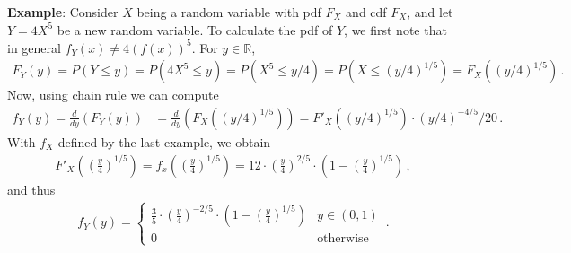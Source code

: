 \documentclass[11pt,oneside]{book}
\theoremstyle{newStyle}
\newcommand{\R}{\mathbb{R}}
\begin{document}
\textbf{Example}:
Consider $X$ being a random variable with pdf $F_X$ and cdf $F_X$, and let $Y = 4X^5$ be a new random variable. To calculate the pdf of $Y$, we first note that in general $f_Y(x) \neq 4(f(x))^5$. For $y \in \R$, 
\begin{align*}
F_Y(y) = P(Y\leq y) = P(4X^5\leq y) = P(X^5\leq y/4) = P(X\leq (y/4)^{1/5}) = F_X((y/4)^{1/5})\,.
\end{align*}
Now, using chain rule we can compute
\begin{align*}
f_Y(y) = \frac{d}{dy}\left(F_Y(y)\right) 
&= \frac{d}{dy}\left( F_X((y/4)^{1/5})\right)=F'_X\left( (y/4)^{1/5}\right) \cdot (y/4)^{-4/5}/20\,.
\end{align*}
With $f_X$ defined by the last example, we obtain
\begin{align*}
F'_X\left(\left( \frac{y}{4}\right)^{1/5}\right) = f_x\left( \left(\frac{y}{4}\right)^{1/5}\right) = 12\cdot \left( \frac{y}{4}\right)^{2/5}\cdot \left( 1- \left( \frac{y}{4}\right)^{1/5}\right)\,,
\end{align*}
and thus
\begin{align*}
f_Y(y) = \begin{cases}
\frac{3}{5}\cdot \left( \frac{y}{4}\right)^{-2/5}\cdot \left( 1- \left( \frac{y}{4}\right)^{1/5}\right) & y \in (0,1)\\
0 &\text{otherwise}
\end{cases}\,.
\end{align*}
\end{document}
